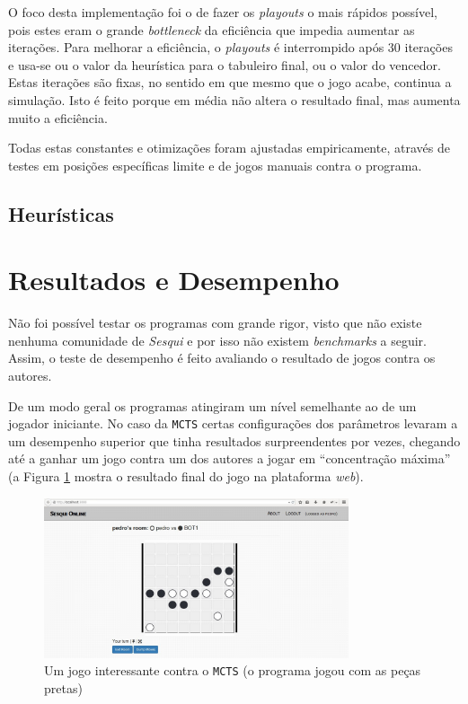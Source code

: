 \documentclass[12pt,a4paper,oneside]{article}
\begin{document}
O foco desta implementação foi o de fazer os \textit{playouts} o mais
rápidos possível, pois estes eram o grande \textit{bottleneck} da
eficiência que impedia aumentar as iterações. Para melhorar a
eficiência, o \textit{playouts} é interrompido após 30 iterações e
usa-se ou o valor da heurística para o tabuleiro final, ou o valor do
vencedor. Estas iterações são fixas, no sentido em que mesmo que o
jogo acabe, continua a simulação. Isto é feito porque em média não
altera o resultado final, mas aumenta muito a eficiência.

Todas estas constantes e otimizações foram ajustadas empiricamente,
através de testes em posições específicas limite e de jogos manuais
contra o programa.

\subsection{Heurísticas}

\lipsum[1]

\lipsum[2]

\lipsum[3]


\section{Resultados e Desempenho}
\label{sec:resdes}

Não foi possível testar os programas com grande rigor, visto que não
existe nenhuma comunidade de \textit{Sesqui} e por isso não existem
\textit{benchmarks} a seguir. Assim, o teste de desempenho é feito
avaliando o resultado de jogos contra os autores.

De um modo geral os programas atingiram um nível semelhante ao de um
jogador iniciante. No caso da \texttt{MCTS} certas configurações dos
parâmetros levaram a um desempenho superior que tinha resultados
surpreendentes por vezes, chegando até a ganhar um jogo contra um dos
autores a jogar em ``concentração máxima'' (a Figura \ref{fig:mctswin}
mostra o resultado final do jogo na plataforma \textit{web}).

\begin{figure}[!htb]
  \centering
  \includegraphics[width=0.8\textwidth]{sesqui_win}
  \caption{Um jogo interessante contra o \texttt{MCTS} (o programa jogou com as peças pretas)}
  \label{fig:mctswin}
\end{figure}
\end{document}

